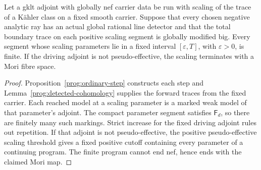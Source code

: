 \begin{corollary}
\label{prog:detected-positive-truncation}
Let a gklt adjoint with globally nef carrier data be run with scaling
of the trace of a K\"ahler class on a fixed smooth carrier. Suppose
that every chosen negative analytic ray has an actual global rational
line detector and that the total boundary trace on each positive
scaling segment is globally modified big. Every segment whose scaling
parameters lie in a fixed interval $[\varepsilon,T]$, with
$\varepsilon>0$, is finite. If the driving adjoint is not
pseudo-effective, the scaling terminates with a Mori fibre space.
\end{corollary}
\begin{proof}
Proposition~\ref{prog:ordinary-step} constructs each step and
Lemma~\ref{prog:detected-cohomology} supplies the forward traces from
the fixed carrier. Each reached model at a scaling parameter is a
marked weak model of that parameter's adjoint. The compact parameter
segment satisfies $\mathsf F_d$, so there are finitely many such
markings. Strict increase for the fixed driving adjoint rules out
repetition. If that adjoint is not pseudo-effective, the positive
pseudo-effective scaling threshold gives a fixed positive cutoff
containing every parameter of a continuing program. The finite
program cannot end nef, hence ends with the claimed Mori map.
\end{proof}
